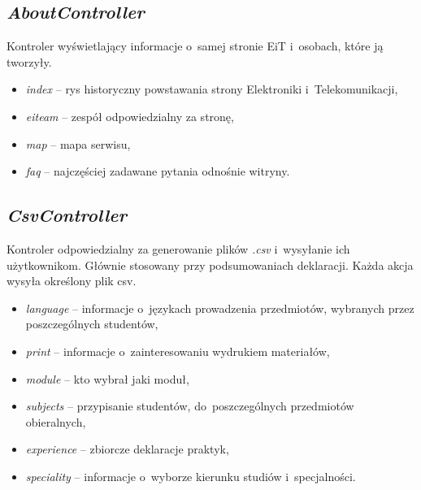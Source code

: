 \documentclass[a4paper,12pt,oneside]{report}
\begin{document}
\subsection{\emph{AboutController}}
\label{con:about}
  Kontroler wyświetlający informacje o~samej stronie EiT i~osobach, które ją tworzyły.
\begin{itemize}
  \item \emph{index} -- rys historyczny powstawania strony Elektroniki i~Telekomunikacji,
  \item \emph{eiteam} -- zespół odpowiedzialny za stronę,
  \item \emph{map} -- mapa serwisu,
  \item \emph{faq} -- najczęściej zadawane pytania odnośnie witryny.
\end{itemize}

\subsection{\emph{CsvController}}
\label{con:csv}
  Kontroler odpowiedzialny za generowanie plików \emph{.csv} i~wysyłanie ich użytkownikom. Głównie stosowany przy podsumowaniach deklaracji. Każda akcja wysyła określony plik csv.
\begin{itemize}
  \item \emph{language} -- informacje o~językach prowadzenia przedmiotów, wybranych przez poszczególnych studentów,
  \item \emph{print} -- informacje o~zainteresowaniu wydrukiem materiałów,
  \item \emph{module} -- kto wybrał jaki moduł,
  \item \emph{subjects} -- przypisanie studentów, do~poszczególnych przedmiotów obieralnych,
  \item \emph{experience} -- zbiorcze deklaracje praktyk,
  \item \emph{speciality} -- informacje o~wyborze kierunku studiów i~specjalności.
\end{itemize}
\end{document}
